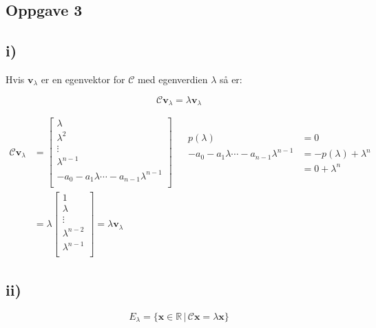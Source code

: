 \documentclass[a4paper, norsk, twoside, 10pt]{article}
\begin{document}
\begin{flushleft}
  \section*{Oppgave 3}

  \subsection*{i)}

  Hvis $\mathbf{v}_{\lambda}$ er en egenvektor for $\mathcal{C}$ med egenverdien $\lambda$ så er:

 \[\mathcal{C}\mathbf{v}_{\lambda} = \lambda \mathbf{v}_{\lambda}\]

 \begin{align*}
   \mathcal{C}\mathbf{v}_{\lambda} &=
   \begin{bmatrix}
     \lambda \\
     \lambda^{2} \\
     \vdots \\
     \lambda^{n-1} \\
     -a_{0} - a_{1}\lambda \cdots -a_{n-1}\lambda^{n-1}\\
   \end{bmatrix}
   &\begin{matrix}
      \begin{split}
      p(\lambda) &= 0\\
      -a_{0} - a_{1}\lambda \cdots -a_{n-1}\lambda^{n-1} &= -p(\lambda) + \lambda^{n} \\
      &= 0 +\lambda^{n}
      \end{split}
      \end{matrix} \\
   &= \lambda
   \begin{bmatrix}
     1 \\
     \lambda \\
     \vdots \\
     \lambda^{n-2} \\
     \lambda^{n-1} \\
   \end{bmatrix}
   = \lambda \mathbf{v}_{\lambda}
 \end{align*}

 \subsection*{ii)}

 \[E_{\lambda} = \{\mathbf{x} \in \mathbb{R} \, | \, \mathcal{C} \mathbf{x} = \lambda \mathbf{x}\}\]


\end{flushleft}
\end{document}
